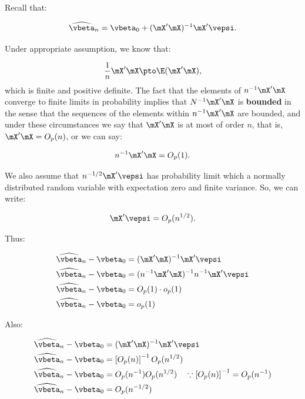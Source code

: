 \documentclass[english,12pt]{book}\usepackage[]{graphicx}\usepackage[]{xcolor}
\begin{document}
\begin{example}
Recall that:

\begin{equation*}
  \widehat{\vbeta}_n = \vbeta_0 + (\mX'\mX)^{-1}\mX'\vepsi.
\end{equation*}

Under appropriate assumption, we know that:

\begin{equation*}
  \frac{1}{n}\mX'\mX\pto \E(\mX'\mX),
\end{equation*}
%
which is finite and positive definite. The fact that the elements of $n^{-1}\mX'\mX$ converge to finite limits in probability implies that $N^{-1}\mX'\mX$ is \textbf{bounded} in the sense that the sequences of the elements within $n^{-1}\mX'\mX$ are bounded, and under these circumstances we say that $\mX'\mX$ is at most of order $n$, that is, $\mX'\mX = O_p(n)$, or we can say:

\begin{equation*}
n^{-1}\mX'\mX = O_p(1).
\end{equation*}

We also assume that $n^{-1/2} \mX'\vepsi$ has probability limit which a normally distributed random variable with expectation zero and finite variance. So, we can write:

\begin{equation*}
\mX'\vepsi = O_p(n^{1/2}).
\end{equation*}

Thus:


\begin{equation*}
  \begin{aligned}
\widehat{\vbeta}_n - \vbeta_0 & =  (\mX'\mX)^{-1}\mX'\vepsi  \\
\widehat{\vbeta}_n - \vbeta_0 & =  (n^{-1}\mX'\mX)^{-1}n^{-1}\mX'\vepsi  \\
\widehat{\vbeta}_n - \vbeta_0 & = O_p(1) \cdot o_p(1) \\
\widehat{\vbeta}_n - \vbeta_0 & = o_p(1)
\end{aligned}
\end{equation*}

Also:

\begin{equation*}
  \begin{aligned}
\widehat{\vbeta}_n - \vbeta_0 & =  (\mX'\mX)^{-1}\mX'\vepsi  \\
\widehat{\vbeta}_n - \vbeta_0 & =  \left[O_p(n)\right]^{-1}O_p(n^{1/2}) \\
\widehat{\vbeta}_n - \vbeta_0 & =  O_p(n^{-1})O_p(n^{1/2}) \quad \because \left[O_p(n)\right]^{-1}= O_p(n^{-1})\\
\widehat{\vbeta}_n - \vbeta_0 & =  O_p(n^{-1/2})\\
\end{aligned}
\end{equation*}
%


\end{example}
\end{document}
